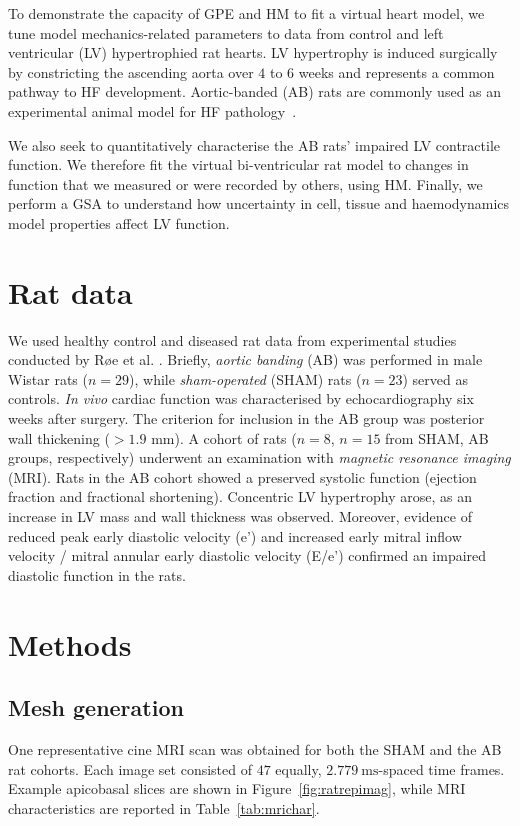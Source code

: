 To demonstrate the capacity of GPE and HM to fit a virtual heart model, we tune model mechanics-related parameters to data from control and left ventricular (LV) hypertrophied rat hearts. LV hypertrophy is induced surgically by constricting the ascending aorta over $4$ to $6$ weeks and represents a common pathway to HF development. Aortic-banded (AB) rats are commonly used as an experimental animal model for HF pathology~\cite{Camacho:2016}.

We also seek to quantitatively characterise the AB rats' impaired LV contractile function. We therefore fit the virtual bi-ventricular rat model to changes in function that we measured or were recorded by others, using HM. Finally, we perform a GSA to understand how uncertainty in cell, tissue and haemodynamics model properties affect LV function.



%
%
%
\section{Rat data}
We used healthy control and diseased rat data from experimental studies conducted by R{\o}e et al. \cite{Roe:2017}. Briefly, \textit{aortic banding} (\acs{AB}) was performed in male Wistar rats ($n=29$), while \textit{sham-operated} (\acs{SHAM}) rats ($n=23$) served as controls. \textit{In vivo} cardiac function was characterised by echocardiography six weeks after surgery. The criterion for inclusion in the AB group was posterior wall thickening ($>1.9$ mm). A cohort of rats ($n=8$, $n=15$ from SHAM, AB groups, respectively) underwent an examination with \textit{magnetic resonance imaging} (\acs{MRI}). Rats in the AB cohort showed a preserved systolic function (ejection fraction and fractional shortening). Concentric LV hypertrophy arose, as an increase in LV mass and wall thickness was observed. Moreover, evidence of reduced peak early diastolic velocity (e’) and increased early mitral inflow velocity / mitral annular early diastolic velocity (E/e’) confirmed an impaired diastolic function in the rats.


%
%
%
\section{Methods}\label{sec:ch4methods}

%
%
%
\subsection{Mesh generation}\label{sec:ch4meshgeneration}
One representative cine MRI scan was obtained for both the SHAM and the AB rat cohorts. Each image set consisted of $47$ equally, $\SI{2.779}{\milli\second}$-spaced time frames. Example apicobasal slices are shown in Figure~\ref{fig:ratrepimag}, while MRI characteristics are reported in Table~\ref{tab:mrichar}.

